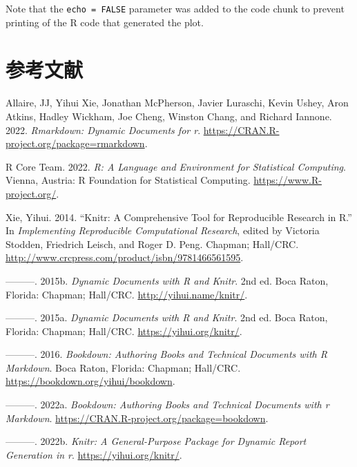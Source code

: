 \documentclass[
  lang=cn,
  11pt,
  scheme=chinese,
  chinesefont=nofont,
  citestyle=gb7714-2015,
  bibstyle=gb7714-2015]{elegantbook}
\newlength{\cslhangindent}
\newlength{\cslentryspacingunit} %
\newenvironment{CSLReferences}[2] %
 {%
  \setlength{\parindent}{0pt}
  \ifodd #1
  \let\oldpar\par
  \def\par{\hangindent=\cslhangindent\oldpar}
  \fi
  \setlength{\parskip}{#2\cslentryspacingunit}
 }%
 {}
\begin{document}
Note that the \texttt{echo\ =\ FALSE} parameter was added to the code chunk to prevent printing of the R code that generated the plot.

\hypertarget{References}{%
\chapter*{参考文献}\label{References}}

\hypertarget{refs}{}
\begin{CSLReferences}{1}{0}
\leavevmode{}%
Allaire, JJ, Yihui Xie, Jonathan McPherson, Javier Luraschi, Kevin Ushey, Aron Atkins, Hadley Wickham, Joe Cheng, Winston Chang, and Richard Iannone. 2022. \emph{Rmarkdown: Dynamic Documents for r}. \url{https://CRAN.R-project.org/package=rmarkdown}.

\leavevmode{}%
R Core Team. 2022. \emph{R: A Language and Environment for Statistical Computing}. Vienna, Austria: R Foundation for Statistical Computing. \url{https://www.R-project.org/}.

\leavevmode{}%
Xie, Yihui. 2014. {``Knitr: A Comprehensive Tool for Reproducible Research in {R}.''} In \emph{Implementing Reproducible Computational Research}, edited by Victoria Stodden, Friedrich Leisch, and Roger D. Peng. Chapman; Hall/CRC. \url{http://www.crcpress.com/product/isbn/9781466561595}.

\leavevmode{}%
---------. 2015b. \emph{Dynamic Documents with {R} and Knitr}. 2nd ed. Boca Raton, Florida: Chapman; Hall/CRC. \url{http://yihui.name/knitr/}.

\leavevmode{}%
---------. 2015a. \emph{Dynamic Documents with {R} and Knitr}. 2nd ed. Boca Raton, Florida: Chapman; Hall/CRC. \url{https://yihui.org/knitr/}.

\leavevmode{}%
---------. 2016. \emph{Bookdown: Authoring Books and Technical Documents with {R} Markdown}. Boca Raton, Florida: Chapman; Hall/CRC. \url{https://bookdown.org/yihui/bookdown}.

\leavevmode{}%
---------. 2022a. \emph{Bookdown: Authoring Books and Technical Documents with r Markdown}. \url{https://CRAN.R-project.org/package=bookdown}.

\leavevmode{}%
---------. 2022b. \emph{Knitr: A General-Purpose Package for Dynamic Report Generation in r}. \url{https://yihui.org/knitr/}.


\end{CSLReferences}
\end{document}
